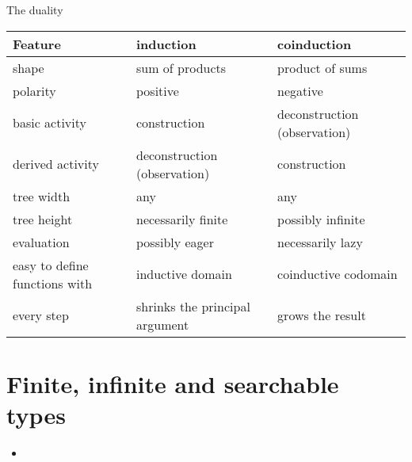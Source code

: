 \documentclass{beamer}
\begin{document}
\begin{frame}{The duality}
\begin{tabular}{ p{3cm} | p{3cm} | p{3cm} }
	Feature & induction & coinduction \\\hline
	shape & sum of products & product of sums \\\hline
	polarity & positive & negative \\\hline
	basic activity & construction & deconstruction (observation) \\\hline
	derived activity & deconstruction (observation) & construction \\\hline
	tree width & any & any \\\hline
	tree height & necessarily finite & possibly infinite \\\hline
	evaluation & possibly eager & necessarily lazy \\\hline
	easy to define functions with & inductive domain & coinductive codomain \\\hline
	every step & shrinks the principal argument & grows the result
\end{tabular}
\end{frame}




\section{Finite, infinite and searchable types}

\begin{frame}{}
\begin{itemize}
	\item 
\end{itemize}
\end{frame}
\end{document}
